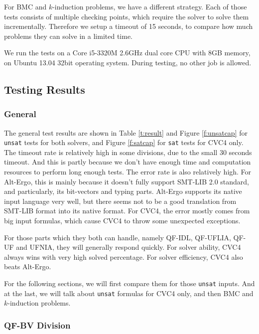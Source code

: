 \documentclass[10pt,twocolumn,letter]{article}
\theoremstyle{definition}
\begin{document}
For BMC and $k$-induction problems, we have a different strategy. Each of those tests consists of multiple checking points, which require the solver to solve them incrementally. Therefore we setup a timeout of 15 seconds, to compare how much problems they can solve in a limited time.

We run the tests on a Core i5-3320M 2.6GHz dual core CPU with 8GB memory, on Ubuntu 13.04 32bit operating system. During testing, no other job is allowed.



\subsection{Testing Results}

\subsubsection{General}

The general test results are shown in Table \ref{t:result} and Figure \ref{f:unsatcap} for {\tt unsat} tests for both solvers, and Figure \ref{f:satcap} for {\tt sat} tests for CVC4 only. The timeout rate is relatively high in some divisions, due to the small 30 seconds timeout. And this is partly because we don't have enough time and computation resources to perform long enough tests. The error rate is also relatively high. For Alt-Ergo, this is mainly because it doesn't fully support SMT-LIB 2.0 standard, and particularly, its bit-vectors and typing parts. Alt-Ergo supports its native input language very well, but there seems not to be a good translation from SMT-LIB format into its native format. For CVC4, the error mostly comes from big input formulas, which cause CVC4 to throw some unexpected exceptions.

For those parts which they both can handle, namely QF-IDL, QF-UFLIA, QF-UF and UFNIA, they will generally respond quickly. For solver ability, CVC4 always wins with very high solved percentage. For solver efficiency, CVC4 also beats Alt-Ergo.

For the following sections, we will first compare them for those {\tt unsat} inputs. And at the last, we will talk about {\tt unsat} formulas for CVC4 only, and then BMC and $k$-induction problems.

\subsubsection{QF-BV Division}
\end{document}
